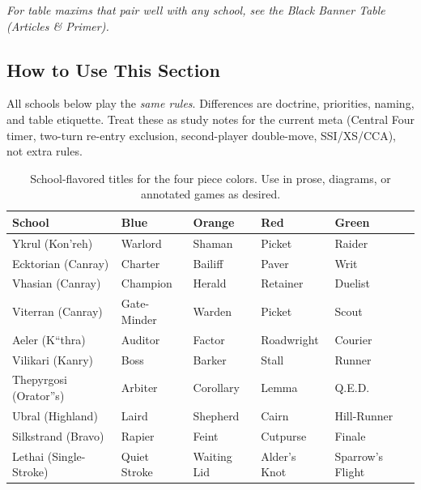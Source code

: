 \documentclass[11pt]{article}
\renewcommand{\arraystretch}{1.15}
\begin{document}
\vspace{0.35em}
\noindent\textit{\color{muted}For table maxims that pair well with any school, see the \emph{Black Banner Table (Articles \& Primer)}.}

\subsection*{How to Use This Section}
All schools below play the \emph{same rules}. Differences are doctrine, priorities, naming, and table etiquette. Treat these as study notes for the current meta (Central Four timer, two-turn re-entry exclusion, second-player double-move, SSI/XS/CCA), not extra rules.


\begin{table}[h]
\centering
\small
\setlength{\tabcolsep}{6pt}
\renewcommand{\arraystretch}{1.15}
\begin{tabular}{@{}lllll@{}}
\toprule
\textbf{School} & \textbf{Blue} & \textbf{Orange} & \textbf{Red} & \textbf{Green}\\
\midrule
Ykrul (Kon'reh)      & Warlord        & Shaman        & Picket      & Raider\\
Ecktorian (Canray)   & Charter        & Bailiff       & Paver       & Writ\\
Vhasian (Canray)     & Champion       & Herald        & Retainer    & Duelist\\
Viterran (Canray)    & Gate-Minder    & Warden        & Picket      & Scout\\
Aeler (K``thra)       & Auditor        & Factor        & Roadwright    & Courier\\
Vilikari (Kanry)     & Boss      & Barker        & Stall     & Runner\\
Thepyrgosi (Orator''s)& Arbiter        & Corollary     & Lemma       & Q.E.D.\\
Ubral (Highland)     & Laird          & Shepherd      & Cairn       & Hill-Runner\\
Silkstrand (Bravo)   & Rapier         & Feint         & Cutpurse    & Finale\\
Lethai (Single-Stroke) & Quiet Stroke & Waiting Lid & Alder's Knot & Sparrow's Flight\\
\bottomrule
\end{tabular}
\caption{School-flavored titles for the four piece colors. Use in prose, diagrams, or annotated games as desired.}
\end{table}
\end{document}
